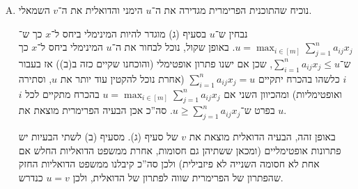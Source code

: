 \documentclass[]{../../../../tex/classes/homework}
\begin{document}
\begin{enumerate}[(A)]
		נבחין שקיים בהכרח פתרון אופטימלי אם הפרימרית חסומה ופיזבילית. ראשית נוכיח שהיא פיזבילית: נטען שהפתרון
		\[ x_j = \frac{1}{n}\quad\quad u = \max_{i \in [n]} \ccb{\sum_{j = 1}^{n}\frac{a_{ij}}{n}} \cup \{0\} \]
		הוא פיזבילי. אכן מתקיים בבירור $\sum_{i = 1}^{n} x_j = \frac{n}{n} = 1$, וכן לכל $i \in [n]$: 
		\[ \sum_{j = 1}^{n}\frac{a_{ij}}{n} - u \le u -u = 0 \]
		(שכן $u$ המקסימום על פני כל ה־$i$־ים של הביטוי $\sum_{j = 1}^{n}\frac{a_{ij}}{n}$) וכל המשתנים שהגדרנו בבירור אי־שליליים. סה''כ מצאנו פתרון פיזבילי. עתה נותר להראות שהתוכנית חסומה. אנuו מחפשים את $\min u$ ולכן יש להראות ש־$u$ חסום מלמטה. ניעזר באילוץ $\sum_{j = 1}^{n} a_{ij} x_j \le u$ לכל $i$, ובפרט עבור $i = 1$. לכל $j$, אם $a_{ij} \ge 0$ מוטב לקבוע $x_j = 0$ כדי למנם את הביטוי $\sum_{j = 1}^{n}a_{ij}x_j$. אם בה''כ $a_{ij} < 0$ אזי $x_j \le 1$ (כי $\sum_{j = 1}^{n} x_j = 1$ ו־$x_j \ge 0$) לכל היותר, וסה''כ במקרה הגרוע נקבל: 
		\[ -\sum_{j = 1}^{n}\sof{a_{1j}} \le \sum_{j = 1}^{n}a_{ij}x_j \le u \]
		נבחין שזהו חסם תחתון על $u$. סה''כ התוכנית הפרימרית חסומה ופיזבילית ולכן קיים לה אופטימום. ממשפט הדואליות החזק לתוכנית הדואלית גם יש אופטימום שמתלכד עם האופטימום של התוכנית הפרימרית, וסיימנו. 
		\item נוכיח שהתוכנית הפרימרית מגדירה את ה־$u$ הימני והדואלית את ה־$v$ השמאלי. 
		
		נבחין ש־$u$ בסעיף (ג) מוגדר להיות המינימלי ביחס ל־$x$ כך ש־$u = \max_{i \in [m]} \sum_{j = 1}^{n}a_{ij}x_j$. באופן שקול, נוכל לבחור את ה־$u$ המינימלי ביחס ל־$x$ כך ש־$\sum_{i =1}^{n}a_{ij}x_j \le u$, שכן אם ישנו פתרון אופטימלי (והוכחנו שקיים כזה ב(ב)) אז בעבור $i$ כלשהו בהכרח יתקיים $\sum_{i = 1}^{n} a_{ij}x_j = u$ (אחרת נוכל להקטין עוד יותר את $u$, וסתירה ואופטימליות) ומהכיוון השני אם $u = \max_{i \in [m]}\sum_{j = 1}^{n}a_{ij}x_j$ בהכרח מתקיים לכל $i$ בפרט ש־$u \ge \sum_{j = 1}^{n} a_{ij}x_j$. סה''כ אכן הבעיה הפרימרית מוצאת את $u$. 
		
		באופן זהה, הבעיה הדואלית מוצאת את $v$ של סעיף (ג). מסעיף (ב) לשתי הבעיות יש פתרונות אופטימליים (ומכאן ששתיהן גם חסומות, אחרת ממשפט הדואליות החלש אם אחת לא חסומה השנייה לא פיזבילית) ולכן סה''כ קיבלנו ממשפט הדואליות החזק שהפתרון של הפרימרית שווה לפתרון של הדואלית, ולכן $u = v$ כנדרש. 
	\end{enumerate}
	
	\newpage
	\npage
	
\end{document}
